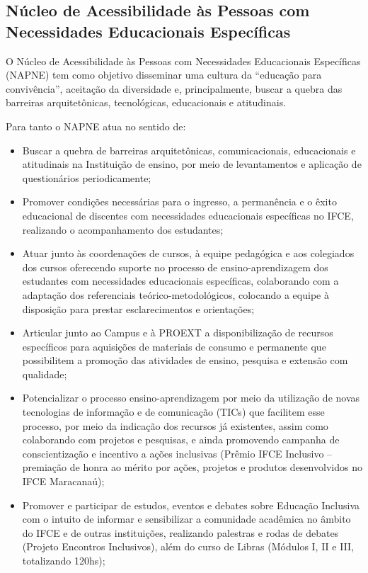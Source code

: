 \subsection{Núcleo de Acessibilidade às Pessoas com Necessidades Educacionais Específicas} 

O Núcleo de Acessibilidade às Pessoas com Necessidades Educacionais Específicas (NAPNE) tem como objetivo disseminar uma cultura da “educação para convivência”, aceitação da diversidade e, principalmente, buscar a quebra das barreiras arquitetônicas, tecnológicas, educacionais e atitudinais.

Para tanto o NAPNE atua no sentido de:

\begin{itemize}
	\item Buscar a quebra de barreiras arquitetônicas, comunicacionais, educacionais e atitudinais na Instituição de ensino, por meio de levantamentos e aplicação de questionários periodicamente;
	\item Promover condições necessárias para o ingresso, a permanência e o êxito educacional de discentes com necessidades educacionais específicas no IFCE, realizando o acompanhamento dos estudantes;
	\item Atuar junto às coordenações de cursos, à equipe pedagógica e aos colegiados dos cursos oferecendo suporte no processo de ensino-aprendizagem dos estudantes com necessidades educacionais específicas, colaborando com a adaptação dos referenciais teórico-metodológicos, colocando a equipe à disposição para prestar esclarecimentos e orientações;
	\item Articular junto ao Campus e à PROEXT a disponibilização de recursos específicos para aquisições de materiais de consumo e permanente que possibilitem a promoção das atividades de ensino, pesquisa e extensão com qualidade;
	\item Potencializar o processo ensino-aprendizagem por meio da utilização de novas tecnologias de informação e de comunicação (TICs) que facilitem esse processo, por meio da indicação dos recursos já existentes, assim como colaborando com projetos e pesquisas, e ainda promovendo campanha de conscientização e incentivo a ações inclusivas (Prêmio IFCE Inclusivo – premiação de honra ao mérito por ações, projetos e produtos desenvolvidos no IFCE Maracanaú);
	\item Promover e participar de estudos, eventos e debates sobre Educação Inclusiva com o intuito de informar e sensibilizar a comunidade acadêmica no âmbito do IFCE e de outras instituições, realizando palestras e rodas de debates (Projeto Encontros Inclusivos), além do curso de Libras (Módulos I, II e III, totalizando 120hs);

\end{itemize}
